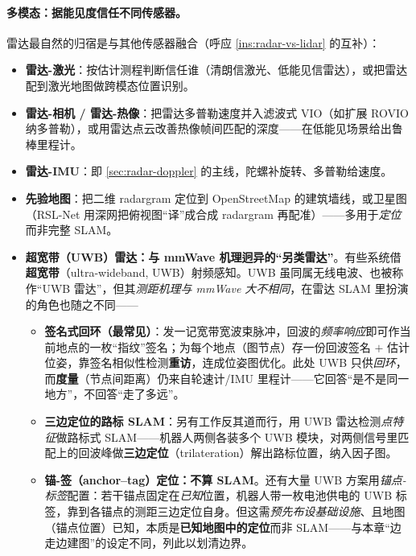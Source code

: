 \paragraph{多模态：据能见度信任不同传感器。}
\label{sec:radar-multimodal}
雷达最自然的归宿是与其他传感器融合（呼应 \cref{ins:radar-vs-lidar} 的互补）\cite{carlone2026handbook}：
\begin{itemize}
  \item \textbf{雷达-激光}：按估计测程判断信任谁（清朗信激光、低能见信雷达），或把雷达配到激光地图做跨模态位置识别。
  \item \textbf{雷达-相机 / 雷达-热像}：把雷达多普勒速度并入滤波式 VIO（如扩展 ROVIO 纳多普勒），或用雷达点云改善热像帧间匹配的深度——在低能见场景给出鲁棒里程计。
  \item \textbf{雷达-IMU}：即 \cref{sec:radar-doppler} 的主线，陀螺补旋转、多普勒给速度。
  \item \textbf{先验地图}：把二维 radargram 定位到 OpenStreetMap 的建筑墙线，或卫星图（RSL-Net 用深网把俯视图“译”成合成 radargram 再配准）——多用于\emph{定位}而非完整 SLAM。
  \item \textbf{超宽带（UWB）雷达：与 mmWave 机理迥异的“另类雷达”}。有些系统借\textbf{超宽带}（ultra-wideband, UWB）射频感知\cite{carlone2026handbook}。UWB 虽同属无线电波、也被称作“UWB 雷达”，但其\emph{测距机理与 mmWave 大不相同}，在雷达 SLAM 里扮演的角色也随之不同——
  \begin{itemize}
    \item \textbf{签名式回环（最常见）}：发一记宽带宽波束脉冲，回波的\emph{频率响应}即可作当前地点的一枚“指纹”签名；为每个地点（图节点）存一份回波签名 $+$ 估计位姿，靠签名相似性检测\textbf{重访}，连成位姿图优化。此处 UWB 只供\emph{回环}，而\textbf{度量}（节点间距离）仍来自轮速计/IMU 里程计——它回答“是不是同一地方”，不回答“走了多远”。
    \item \textbf{三边定位的路标 SLAM}：另有工作反其道而行，用 UWB 雷达检测\emph{点特征}做路标式 SLAM——机器人两侧各装多个 UWB 模块，对两侧信号里匹配上的回波峰做\textbf{三边定位}（trilateration）解出路标位置，纳入因子图。
    \item \textbf{锚-签（anchor--tag）定位：不算 SLAM}。还有大量 UWB 方案用\emph{锚点-标签}配置：若干锚点固定在\emph{已知}位置，机器人带一枚电池供电的 UWB 标签，靠到各锚点的测距三边定位自身。但这需\emph{预先布设基础设施}、且地图（锚点位置）已知，本质是\textbf{已知地图中的定位}而非 SLAM——与本章“边走边建图”的设定不同，列此以划清边界。
  \end{itemize}
\end{itemize}

